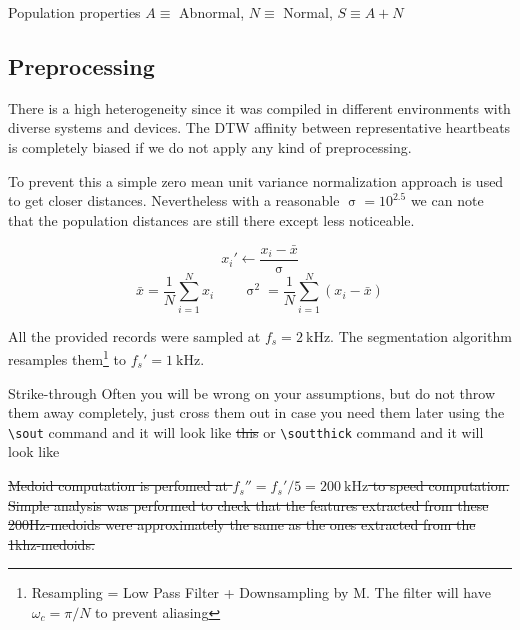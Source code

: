 \documentclass{project-logbook}
\begin{document}
{\begin{table}[ht]
    \caption{Population properties $A \equiv$ Abnormal, $N\equiv$ Normal, $S\equiv A+N$}
    \label{tab:populations}
\end{table}

\subsection{Preprocessing} \label{sub:preprocessing}

There is a high heterogeneity since it was compiled in different environments with diverse systems and devices. The DTW affinity between representative heartbeats is completely biased if we do not apply any kind of preprocessing.

To prevent this a simple zero mean unit variance normalization approach is used to get closer distances. Nevertheless with a reasonable $\upsigma  = 10^{2.5}$ we can note that the population distances are still there except less noticeable.

\begin{equation}
    x_i' \gets \frac{x_i-\bar{x}}{\upsigma}
\end{equation}
\begin{equation}
    \bar{x} = \frac{1}{N}\sum_{i=1}^{N} x_i \qquad \upsigma^2 = {\frac{1}{N}\sum_{i=1}^{N} (x_i-\bar{x})}
\end{equation}

All the provided records were sampled at $f_s = \SI{2}{\kilo\Hz}$. The segmentation algorithm resamples them\footnote{Resampling = Low Pass Filter + Downsampling by M. The filter will have $\omega_c = \pi/N$ to prevent aliasing} to $ f_s' = \SI{1}{\kilo\Hz}$.
\begin{tipt}{Strike-through}
 Often you will be wrong on your assumptions, but do not throw them away completely, just cross them out in case you need them later using the \texttt{\textbackslash sout} command and it will look like \sout{this} or \texttt{\textbackslash soutthick} command and it will look like 
\end{tipt}

\sout{Medoid computation is perfomed at $f_s'' = f_s'/5 = \SI{200}{\kilo\hertz}$ to speed computation. Simple analysis was performed to check that the features extracted from these 200Hz-medoids were approximately the same as the ones extracted from the  1khz-medoids.}


}
\end{document}
